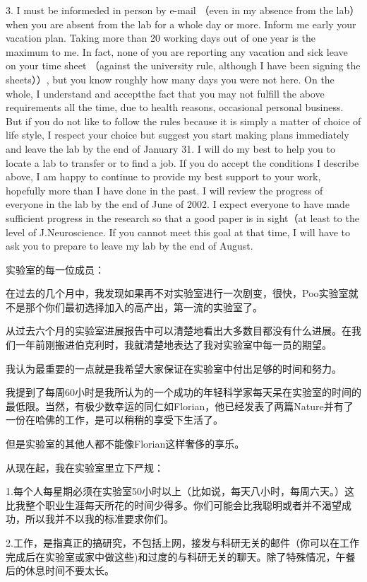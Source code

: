 3. I must be informeded in person by e-mail （even in my absence from the lab）when you are absent from the lab for a whole day or more. Inform me early your vacation plan. Taking more than 20 working days out of one year is the maximum to me. In fact, none of you are reporting any vacation and sick leave on your time sheet （against the university rule, although I have been signing the sheets））, but you know roughly how many days you were not here. On the whole, I understand and acceptthe fact that you may not fulfill the above requirements all the time, due to health reasons, occasional personal business. But if you do not like to follow the rules because it is simply a matter of choice of life style, I respect your choice but suggest you start making plans immediately and leave the lab by the end of January 31. I will do my best to help you to locate a lab to transfer or to find a job. If you do accept the conditions I describe above, I am happy to continue to provide my best support to your work, hopefully more than I have done in the past. I will review the progress of everyone in the lab by the end of June of 2002. I expect everyone to have made sufficient progress in the research so that a good paper is in sight（at least to the level of J.Neuroscience. If you cannot meet this goal at that time, I will have to ask you to prepare to leave my lab by the end of August.

实验室的每一位成员：

在过去的几个月中，我发现如果再不对实验室进行一次剧变，很快，Poo实验室就不是那个你们最初选择加入的高产出，第一流的实验室了。

从过去六个月的实验室进展报告中可以清楚地看出大多数目都没有什么进展。在我们一年前刚搬进伯克利时，我就清楚地表达了我对实验室中每一员的期望。

我认为最重要的一点就是我希望大家保证在实验室中付出足够的时间和努力。

我提到了每周60小时是我所认为的一个成功的年轻科学家每天呆在实验室的时间的最低限。当然，有极少数幸运的同仁如Florian，他已经发表了两篇Nature并有了一份在哈佛的工作，是可以稍稍的享受下生活了。

但是实验室的其他人都不能像Florian这样奢侈的享乐。

从现在起，我在实验室里立下严规：

1.每个人每星期必须在实验室50小时以上（比如说，每天八小时，每周六天。）这比我整个职业生涯每天所花的时间少得多。你们可能会比我聪明或者并不渴望成功，所以我并不以我的标准要求你们。

2.工作，是指真正的搞研究，不包括上网，接发与科研无关的邮件（你可以在工作完成后在实验室或家中做这些)和过度的与科研无关的聊天。除了特殊情况，午餐后的休息时间不要太长。

